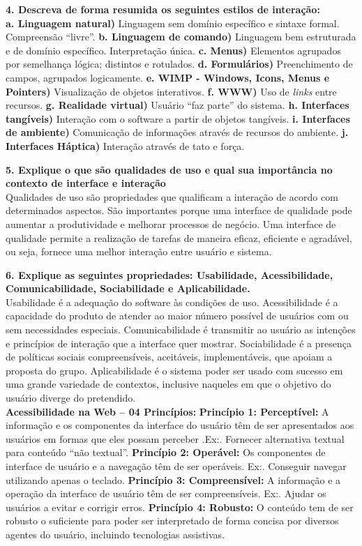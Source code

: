 \documentclass[9pt, twocolumn, article]{memoir}
\begin{document}
\textbf{4. Descreva de forma resumida os seguintes estilos de interação:}\\
\textbf{a. Linguagem natural)} Linguagem sem domínio específico e sintaxe formal. Compreensão ``livre''.
\textbf{b. Linguagem de comando)} Linguagem bem estruturada e de domínio específico. Interpretação única.
\textbf{c. Menus)} Elementos agrupados por semelhança lógica; distintos e rotulados.
\textbf{d. Formulários)} Preenchimento de campos, agrupados logicamente.
\textbf{e. WIMP - Windows, Icons, Menus e Pointers)} Visualização de objetos interativos.
\textbf{f. WWW)} Uso de \emph{links} entre recursos.
\textbf{g. Realidade virtual)} Usuário ``faz parte'' do sistema.
\textbf{h. Interfaces tangíveis)} Interação com o software a partir de objetos tangíveis.
\textbf{i. Interfaces de ambiente)} Comunicação de informações através de recursos do ambiente.
\textbf{j. Interfaces Háptica)} Interação através de tato e força.

\textbf{5. Explique  o  que  são  qualidades  de  uso  e  qual  sua importância  no  contexto  de  interface  e interação}\\
Qualidades de uso são propriedades que qualificam a interação de acordo com determinados aspectos. São importantes porque uma interface de qualidade pode aumentar a produtividade e melhorar processos de negócio. Uma interface de qualidade permite a realização de tarefas de maneira eficaz, eficiente e agradável, ou seja, fornece uma melhor interação entre usuário e sistema.

\textbf{6. Explique     as    seguintes    propriedades:    Usabilidade,    Acessibilidade,    Comunicabilidade, Sociabilidade e Aplicabilidade.}\\
Usabilidade é a adequação do software às condições de uso. Acessibilidade é a capacidade do produto de atender ao maior número possível de usuários com ou sem necessidades especiais. Comunicabilidade é transmitir ao usuário as intenções e princípios de interação que a interface quer mostrar. Sociabilidade é a presença de políticas sociais compreensíveis, aceitáveis, implementáveis, que apoiam a proposta do grupo. Aplicabilidade é o sistema poder ser usado com sucesso em uma grande variedade de contextos, inclusive naqueles em que o objetivo do usuário diverge do pretendido.\\

\textbf{Acessibilidade na Web – 04 Princípios: } \textbf{Princípio 1: Perceptível: } A informação e os componentes da interface do usuário têm de ser apresentados aos usuários em formas que eles possam perceber .Ex:. Fornecer alternativa textual para conteúdo “não textual”.\textbf{ Princípio 2: Operável:} Os componentes de interface de usuário e a navegação têm de ser operáveis. Ex:. Conseguir navegar utilizando apenas o teclado. \textbf{Princípio 3: Compreensível: } A informação e a operação da interface de usuário têm de ser compreensíveis. Ex:. Ajudar os usuários a evitar e corrigir erros. \textbf{Princípio 4: Robusto: } O conteúdo tem de ser robusto o suficiente para poder ser interpretado de forma concisa por diversos agentes do usuário, incluindo tecnologias assistivas.
\end{document}
